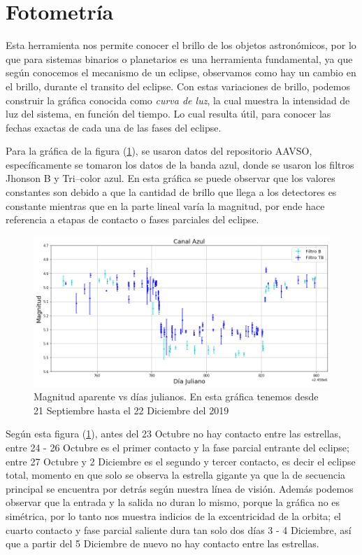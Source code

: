 \documentclass[12pt,oneside,openany,letter]{book}
\begin{document}

\section{Fotometría}
Esta herramienta nos permite conocer el brillo de los objetos astronómicos, por lo que para sistemas binarios o planetarios es una herramienta fundamental, ya que según conocemos el mecanismo de un eclipse, observamos como hay un cambio en el brillo, durante el transito del eclipse. Con estas variaciones de brillo, podemos construir la gráfica conocida como \textit{curva de luz}, la cual muestra la intensidad de luz del sistema, en función del tiempo. Lo cual resulta útil, para conocer las fechas exactas de cada una de las fases del eclipse.
\vspace{2mm}

\noindent Para la gráfica de la figura (\ref{fig:curvaluz}), se usaron datos del repositorio AAVSO, específicamente se tomaron los datos de la banda azul, donde se usaron los filtros Jhonson B y Tri–color azul. En esta gráfica se puede observar que los valores constantes son debido a que la cantidad de brillo que llega a los detectores es constante mientras que en la parte lineal varía la magnitud, por ende hace referencia a etapas de contacto o fases parciales del eclipse.

\begin{figure}[h]
    \centering
    \includegraphics[width=1\linewidth]{Gaficas/curva luz.png}
    \caption{Magnitud aparente vs días julianos. En esta gráfica tenemos desde 21 Septiembre hasta el 22 Diciembre del 2019}
    \label{fig:curvaluz}
\end{figure}

\noindent Según esta figura (\ref{fig:curvaluz}), antes del 23 Octubre no hay contacto entre las estrellas, entre 24 - 26 Octubre es el primer contacto y la fase parcial entrante del eclipse; entre 27 Octubre y 2 Diciembre es el segundo y tercer contacto, es decir el eclipse total, momento en que solo se observa la estrella gigante ya que la de secuencia principal se encuentra por detrás según nuestra línea de visión. Además podemos observar que la entrada y la salida no duran lo mismo, porque la gráfica no es simétrica, por lo tanto nos muestra indicios de la excentricidad de la orbita; el cuarto contacto y fase parcial saliente dura tan solo dos días 3 - 4 Diciembre, así que a partir del 5 Diciembre de nuevo no hay contacto entre las estrellas.
\end{document}
